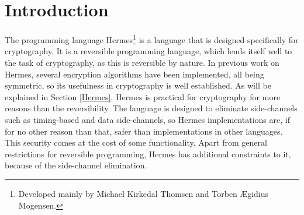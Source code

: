 

\chapter{Introduction}



The programming language Hermes\footnote{Developed mainly by Michael Kirkedal Thomsen and Torben Ægidius Mogensen.} is a language that is designed specifically for cryptography. It is a reversible programming language, which lends itself well to the task of cryptography, as this is reversible by nature. In previous work on Hermes, several encryption algorithms have been implemented, all being symmetric, so its usefulness in cryptography is well established. As will be explained in Section \ref{Hermes}, Hermes is practical for cryptography for more reasons than the reversibility. The language is designed to eliminate side-channels such as timing-based and data side-channels, so Hermes implementations are, if for no other reason than that, safer than implementations in other languages. This security comes at the cost of some functionality. Apart from general restrictions for reversible programming, Hermes has additional constraints to it, because of the side-channel elimination.

